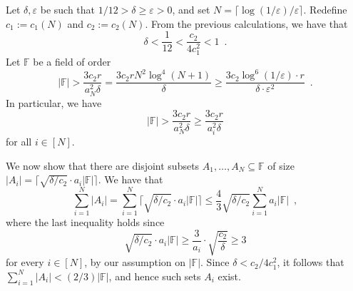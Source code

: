 \documentclass[11pt]{article}
\numberwithin{equation}{section}
\theoremstyle{definition}
\theoremstyle{plain}
\theoremstyle{plain}
\newcommand{\colored}{}
\newcommand{\Field}{\colored{\mathbb F}}
\newcommand{\degree}{\colored{r}}
\newcommand{\prox}{\colored{\delta}}
\newcommand{\DefineEqual}{:=}
\newcommand{\ceil}[1]{{\lceil#1\rceil}}
\newcommand{\eps}{\varepsilon}
\newcommand\abs[1]{\colored{\left|#1\right|}}
\begin{document}
Let $\delta, \eps$ be such that ${1}/{12} > \delta \geq \eps > 0$, and set $N = \ceil{{\log(1/\eps)}/{\eps}}$. Redefine $c_1 \DefineEqual c_1(N)$ and $c_2  \DefineEqual c_2(N)$. {}From the previous calculations, we have that
\[
  \prox < \frac{1}{12} < \frac{c_2}{4 c_1^2} < 1\enspace.
\]
Let $\Field$ be a field of
%
order  %
\[
  \abs{\Field} > \frac{3 c_2 \degree}{a_N^2\prox} = \frac{3 c_2 \degree N^2 \log^4(N+1)}{\prox} \geq  \frac{3 c_2 \log^6(1/\eps) \cdot \degree}{\prox \cdot \eps^2}\enspace.
\]
In particular, we have
\[
  \abs{\Field} > \frac{3 c_2 \degree}{a_N^2\prox} \geq \frac{3 c_2 \degree}{a_i^2\prox}
\]
for all $i \in [N]$.

We now show that there are disjoint subsets $A_1, \dots, A_N \subseteq \Field$ of size $\abs{A_i} = \ceil{\sqrt{\prox/c_2} \cdot a_i \abs{\Field}}$. We have that
\begin{equation*}
        \sum_{i=1}^N \abs{A_i}
        = \sum_{i=1}^N  \ceil{\sqrt{\prox/c_2} \cdot a_i \abs{\Field}}
        \leq \frac{4}{3} \sqrt{\prox/c_2} \sum_{i=1}^N  a_i \abs{\Field}
        \enspace,
    \end{equation*}
    where the last inequality holds since
    \[
      \sqrt{\prox/c_2} \cdot a_i \abs{\Field} \geq \frac{3}{a_i} \cdot \sqrt{\frac{c_2}{\prox}} \geq 3
    \]
    for every $i \in [N]$, by our assumption on $\abs{\Field}$. Since $\prox < c_2 / 4c_1^2$, it follows that $\sum_{i=1}^N \abs{A_i} < ({2}/{3})\abs{\Field}$, and hence
%
%
%
such sets $A_i$ exist.                  %
\end{document}
